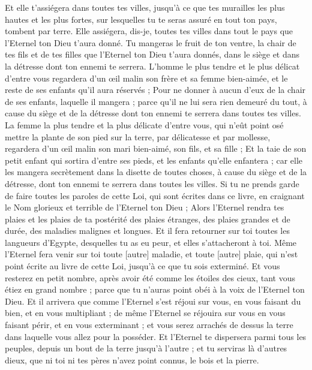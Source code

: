 \begin{multicols}{2}
Et elle t'assiégera dans toutes tes villes, jusqu'à ce que tes murailles les plus hautes et les plus fortes, sur lesquelles tu te seras assuré en tout ton pays, tombent par terre. Elle assiégera, dis-je, toutes tes villes dans tout le pays que l'Eternel ton Dieu t'aura donné.
Tu mangeras le fruit de ton ventre, la chair de tes fils et de tes filles que l'Eternel ton Dieu t'aura donnés, dans le siège et dans la détresse dont ton ennemi te serrera.
L'homme le plus tendre et le plus délicat d'entre vous regardera d'un œil malin son frère et sa femme bien-aimée, et le reste de ses enfants qu'il aura réservés ;
Pour ne donner à aucun d'eux de la chair de ses enfants, laquelle il mangera ; parce qu'il ne lui sera rien demeuré du tout, à cause du siège et de la détresse dont ton ennemi te serrera dans toutes tes villes.
La femme la plus tendre et la plus délicate d'entre vous, qui n'eût point osé mettre la plante de son pied sur la terre, par délicatesse et par mollesse, regardera d'un œil malin son mari bien-aimé, son fils, et sa fille ;
Et la taie de son petit enfant qui sortira d'entre ses pieds, et les enfants qu'elle enfantera ; car elle les mangera secrètement dans la disette de toutes choses, à cause du siège et de la détresse, dont ton ennemi te serrera dans toutes les villes.
Si tu ne prends garde de faire toutes les paroles de cette Loi, qui sont écrites dans ce livre, en craignant le Nom glorieux et terrible de l'Eternel ton Dieu ;
Alors l'Eternel rendra tes plaies et les plaies de ta postérité des plaies étranges, des plaies grandes et de durée, des maladies malignes et longues.
Et il fera retourner sur toi toutes les langueurs d'Egypte, desquelles tu as eu peur, et elles s'attacheront à toi.
Même l'Eternel fera venir sur toi toute [autre] maladie, et toute [autre] plaie, qui n'est point écrite au livre de cette Loi, jusqu'à ce que tu sois exterminé.
Et vous resterez en petit nombre, après avoir été comme les étoiles des cieux, tant vous étiez en grand nombre ; parce que tu n'auras point obéi à la voix de l'Eternel ton Dieu.
Et il arrivera que comme l'Eternel s'est réjoui sur vous, en vous faisant du bien, et en vous multipliant ; de même l'Eternel se réjouira sur vous en vous faisant périr, et en vous exterminant ; et vous serez arrachés de dessus la terre dans laquelle vous allez pour la posséder.
Et l'Eternel te dispersera parmi tous les peuples, depuis un bout de la terre jusqu'à l'autre ; et tu serviras là d'autres dieux, que ni toi ni tes pères n'avez point connus, le bois et la pierre.

\end{multicols}
